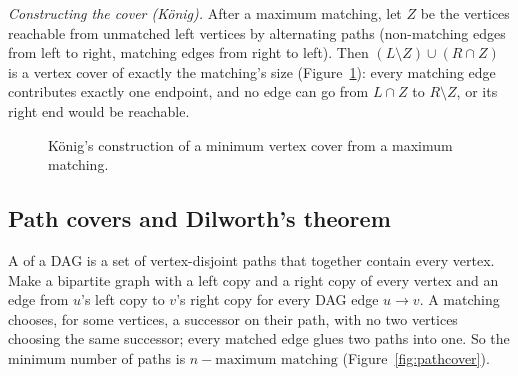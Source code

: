 \emph{Constructing the cover (König).} After a maximum matching, let $Z$ be the vertices reachable from unmatched left vertices by
alternating paths (non-matching edges from left to right, matching edges from right to left). Then $(L \setminus Z) \cup (R \cap Z)$
is a vertex cover of exactly the matching's size (Figure~\ref{fig:konig}): every matching edge contributes exactly one endpoint, and
no edge can go from $L \cap Z$ to $R \setminus Z$, or its right end would be reachable.

\begin{figure}[htbp]
\centering
{}
\caption{König's construction of a minimum vertex cover from a maximum matching.}
\label{fig:konig}
\end{figure}


\subsection{Path covers and Dilworth's theorem}

A  of a DAG is a set of vertex-disjoint paths that together contain every vertex. Make a bipartite graph with a
left copy and a right copy of every vertex and an edge from $u$'s left copy to $v$'s right copy for every DAG edge $u \to v$. A
matching chooses, for some vertices, a successor on their path, with no two vertices choosing the same successor; every matched
edge glues two paths into one. So the minimum number of paths is $n - \text{maximum matching}$ (Figure~\ref{fig:pathcover}).

